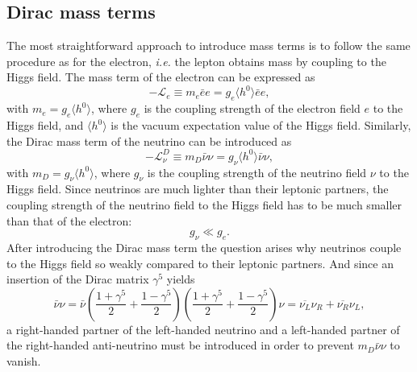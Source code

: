 \subsection{Dirac mass terms}
\label{sec:dirac}
The most straightforward approach to introduce mass terms is to follow the same procedure as for the electron, \textit{i.e.} the lepton obtains mass by coupling to the Higgs field. The mass term of the electron can be expressed as
\begin{equation}
  \label{eq:dme}
  -\mathcal{L}_{e} \equiv m_{e}\bar{e}e = g_{e}\langle      
  h^{0}\rangle \bar{e}e,
\end{equation}
with $m_{e} = g_{e} \langle h^{0}\rangle$, where $g_e$ is the coupling strength of the electron field $e$ to the Higgs field, and $\langle h^{0} \rangle$ is the vacuum expectation value of the Higgs field. Similarly, the Dirac mass term of the neutrino can be introduced as
\begin{equation}
  \label{eq:dmnu}
  -\mathcal{L}_{\nu}^{D} \equiv m_{D}\bar{\nu}\nu = g_{\nu} \langle       h^{0} \rangle \bar{\nu}\nu,
\end{equation}
with $m_{D} = g_{\nu} \langle h^{0}\rangle$, where $g_\nu$ is the coupling strength of the neutrino field $\nu$ to the Higgs field. Since neutrinos are much lighter than their leptonic partners, the coupling strength of the neutrino field to the Higgs field has to be much smaller than that of the electron:
\begin{equation}
  \label{eq:gg}
  g_{\nu} \ll g_{e}.
\end{equation}
After introducing the Dirac mass term the question arises why
neutrinos couple to the Higgs field so weakly compared to their
leptonic partners. And since an insertion of the Dirac matrix $\gamma^{5}$ yields
\begin{equation}
  \label{eq:2psi}
  \bar{\nu}\nu = \bar{\nu}    
  \left(\frac{1+\gamma^5}{2}+\frac{1-\gamma^5}{2}\right)
  \left(\frac{1+\gamma^5}{2}+\frac{1-\gamma^5}{2}\right) \nu =
  \overline{\nu_{L}}\nu_{R}+\overline{\nu_{R}}\nu_{L},
\end{equation}
a right-handed partner of the left-handed neutrino and a left-handed partner of the right-handed anti-neutrino must be introduced in order to prevent $m_{D}\bar{\nu}\nu$ to vanish.


